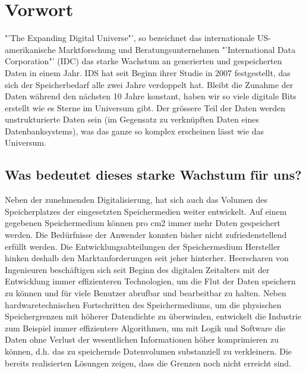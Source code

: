 
\cleardoublepage
\chapter{Vorwort}
"'The Expanding Digital Universe"', so bezeichnet das internationale US-amerikanische Marktforschung und Beratungsunternehmen "'International Data Corporation"' (IDC) das starke Wachstum an generierten und gespeicherten Daten in einem Jahr. IDS hat seit Beginn ihrer Studie in 2007 festgestellt, das sich der Speicherbedarf alle zwei Jahre verdoppelt hat. Bleibt die Zunahme der Daten während den nächsten 10 Jahre konstant, haben wir so viele digitale Bits erstellt wie es Sterne im Universum gibt. Der grössere Teil der Daten werden unstrukturierte Daten sein (im Gegensatz zu verknüpften Daten eines Datenbanksystems), was das ganze so komplex erscheinen lässt wie das Universum. \cite{Gantz2011}

\section{Was bedeutet dieses starke Wachstum für uns?}
Neben der zunehmenden Digitalisierung, hat sich auch das Volumen des Speicherplatzes der eingesetzten Speichermedien weiter entwickelt. Auf einem gegebenen Speichermedium können pro cm2 immer mehr Daten gespeichert werden. Die Bedürfnisse der Anwender konnten bisher nicht zufriedenstellend erfüllt werden. Die Entwicklungsabteilungen der Speichermedium Hersteller hinken deshalb den Marktanforderungen seit jeher hinterher. Heerscharen von Ingenieuren beschäftigen sich seit Beginn des digitalen Zeitalters mit der Entwicklung immer effizienteren Technologien, um die Flut der Daten speichern zu können und für viele Benutzer abrufbar und bearbeitbar zu halten. Neben hardwaretechnischen Fortschritten des Speichermediums, um die physischen Speichergrenzen mit höherer Datendichte zu überwinden, entwickelt die Industrie zum Beispiel immer effizientere Algorithmen, um mit Logik und Software die Daten ohne Verlust der wesentlichen Informationen höher komprimieren zu können, d.h. das zu speichernde Datenvolumen substanziell zu verkleinern. Die bereits realisierten Lösungen zeigen, dass die Grenzen noch nicht erreicht sind.

